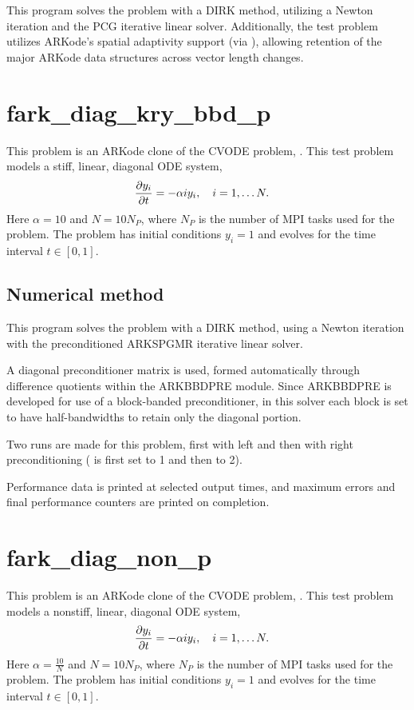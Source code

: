 \documentclass[letterpaper,10pt,english]{sphinxmanual}
\begin{document}
This program solves the problem with a DIRK method, utilizing a Newton
iteration and the PCG iterative linear solver.  Additionally, the test
problem utilizes ARKode's spatial adaptivity support (via
), allowing retention of the major ARKode data
structures across vector length changes.


\chapter{fark\_diag\_kry\_bbd\_p}
\label{fark_diag_kry_bbd_p:fark-diag-kry-bbd-p}\label{fark_diag_kry_bbd_p::doc}\label{fark_diag_kry_bbd_p:id1}
This problem is an ARKode clone of the CVODE problem,
.  This test problem models a stiff, linear,
diagonal ODE system,
\begin{gather}
\begin{split}\frac{\partial y_i}{\partial t} &= -\alpha i y_i, \quad i=1,\ldots N.\end{split}\notag
\end{gather}
Here $\alpha=10$ and $N=10 N_P$, where $N_P$ is the
number of MPI tasks used for the problem.  The problem has initial
conditions $y_i=1$ and evolves for the time interval $t\in [0,1]$.


\section{Numerical method}
\label{fark_diag_kry_bbd_p:numerical-method}
This program solves the problem with a DIRK method, using a Newton
iteration with the preconditioned ARKSPGMR iterative linear solver.

A diagonal preconditioner matrix is used, formed automatically through
difference quotients within the ARKBBDPRE module.  Since ARKBBDPRE is
developed for use of a block-banded preconditioner, in this solver
each block is set to have half-bandwidths  to
retain only the diagonal portion.

Two runs are made for this problem, first with left and then with
right preconditioning ( is first set to 1 and then to 2).

Performance data is printed at selected output times, and maximum
errors and final performance counters are printed on completion.


\chapter{fark\_diag\_non\_p}
\label{fark_diag_non_p:fark-diag-non-p}\label{fark_diag_non_p::doc}\label{fark_diag_non_p:id1}
This problem is an ARKode clone of the CVODE problem,
.  This test problem models a nonstiff, linear,
diagonal ODE system,
\begin{gather}
\begin{split}\frac{\partial y_i}{\partial t} &= -\alpha i y_i, \quad i=1,\ldots N.\end{split}\notag
\end{gather}
Here $\alpha=\frac{10}{N}$ and $N=10 N_P$, where $N_P$ is the
number of MPI tasks used for the problem.  The problem has initial
conditions $y_i=1$ and evolves for the time interval $t\in [0,1]$.
\end{document}
